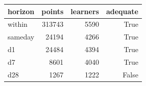 \begin{tabular}{lrrr}
\toprule
horizon & points & learners & adequate \\
\midrule
within & 313743 & 5590 & True \\
sameday & 24194 & 4266 & True \\
d1 & 24484 & 4394 & True \\
d7 & 8601 & 4040 & True \\
d28 & 1267 & 1222 & False \\
\bottomrule
\end{tabular}
